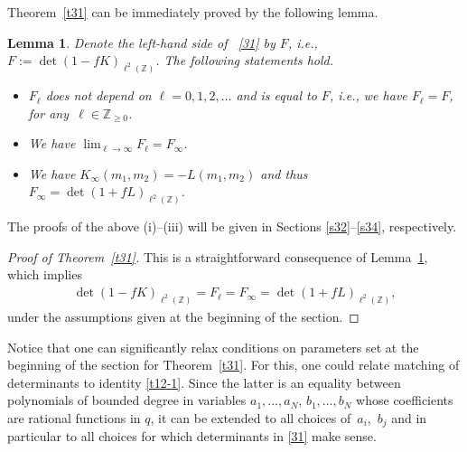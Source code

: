 \documentclass[pdftex]{sigma}
\numberwithin{equation}{section}
\newtheorem{Lemma}[Theorem]{Lemma}
\def\i{\infty}
\def\Z{\mathbb{Z}}
\begin{document}
Theorem~\ref{t31} can be immediately proved by the following lemma.

\begin{Lemma}\label{l32}
Denote the left-hand side of ~\eqref{31} by $F$, i.e., $F:=\det\left(1-f K\right)_{\ell^2(\Z)}$. The following statements hold.
\begin{itemize}\itemsep=0pt
\item[{\rm (i)}]
$F_\ell$ does not depend on $\ell=0,1,2,\dots$ and is equal to $F$, i.e., we have $F_{\ell}=F$, for any~${\ell\in\Z_{\ge 0}}$.
\item[{\rm (ii)}] We have $\lim_{\ell \rightarrow\i} F_{\ell}=F_{\i}$.
\item[{\rm (iii)}] We have $K_{\i}(m_1,m_2)=-L(m_1,m_2)$
and thus $F_{\i}=\det(1+f L)_{\ell^2(\Z)}$.
\end{itemize}
\end{Lemma}
The proofs of the above (i)--(iii) will
be given in Sections \ref{s32}--\ref{s34}, respectively.

\begin{proof}[Proof of Theorem~\ref{t31}]
 This is a straightforward consequence of Lemma~\ref{l32}, which implies
 \begin{align*}
 \det(1-fK)_{\ell^2(\Z)}
 =
 F_{\ell}
 =
 F_{\i}
 =
 \det(1+fL)_{\ell^2(\Z)},
 \end{align*}
 under the assumptions given at the beginning of the section.
 \end{proof}

 Notice that one can significantly relax conditions on parameters set at the beginning of the section for Theorem~\ref{t31}. For this, one could relate matching of determinants to identity \eqref{t12-1}. Since the latter is an equality between polynomials of bounded degree in variables $a_1,\dots,a_N$, $b_1,\dots,b_N$ whose coefficients are rational functions in $q$, it can be extended to all choices of~$a_i$,~$b_j$ and in particular to all choices for which determinants in \eqref{31} make sense.
\end{document}
